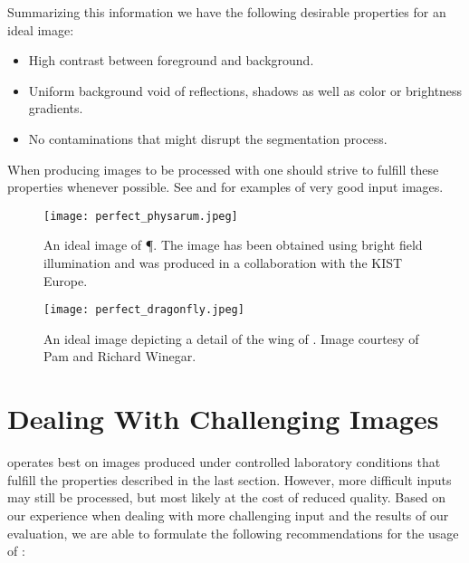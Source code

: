 	\newpage

	Summarizing this information we have the following desirable properties for an ideal image:

	\begin{itemize}
		\item High contrast between foreground and background.
		\item Uniform background void of reflections, shadows as well as color or brightness gradients.
		\item No contaminations that might disrupt the segmentation process.
	\end{itemize}

	When producing images to be processed with \NEFI one should strive to fulfill these properties whenever possible. See  and  for examples of very good input images.

	\begin{figure}
		\centering
		\texttt{[image: perfect\_physarum.jpeg]}
		\caption[\NEFIs strengths - An ideal image of \P]{An ideal image of \P. The image has been obtained using bright field illumination and was produced in a collaboration with the KIST Europe.}
		\label{fig:sup:good1}
	\end{figure}

	\begin{figure}
		\centering
		\texttt{[image: perfect\_dragonfly.jpeg]}
		\caption[\NEFIs strengths - An ideal image of \A]{An ideal image depicting a detail of the wing of \A. Image courtesy of Pam and Richard Winegar.}
		\label{fig:sup:good2}
	\end{figure}
 
\section{Dealing With Challenging Images}

	\NEFI operates best on images produced under controlled laboratory conditions that fulfill the properties described in the last section. However, more difficult inputs may still be processed, but most likely at the cost of reduced quality. Based on our experience when dealing with more challenging input and the results of our evaluation, we are able to formulate the following recommendations for the usage of \NEFI:

